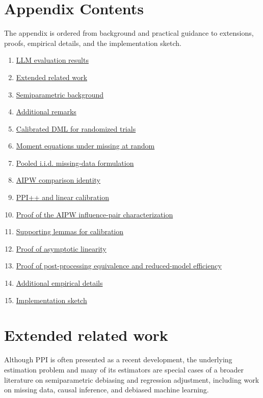 \documentclass{article}
\theoremstyle{plain}
\theoremstyle{definition}
\newcommand{\1}{\mathbf{1}}
\begin{document}
\section*{Appendix Contents}
The appendix is ordered from background and practical guidance to extensions, proofs, empirical details, and the implementation sketch.
\begin{enumerate}[leftmargin=7mm,label=\Alph*.]
\item \hyperref[app:simresults]{LLM evaluation results}
\item \hyperref[app:related-work]{Extended related work}
\item \hyperref[app:semicolon]{Semiparametric background}
\item \hyperref[appendix:remarks]{Additional remarks}
\item \hyperref[app:causal]{Calibrated DML for randomized trials}
\item \hyperref[appendix::momentgeneral]{Moment equations under missing at random}
\item \hyperref[app:iid]{Pooled i.i.d. missing-data formulation}
\item \hyperref[app:repr]{AIPW comparison identity}
\item \hyperref[sec:ppi++]{PPI++ and linear calibration}
\item \hyperref[app:eif]{Proof of the AIPW influence-pair characterization}
\item \hyperref[app:iso-lemmas]{Supporting lemmas for calibration}
\item \hyperref[app:al]{Proof of asymptotic linearity}
\item \hyperref[app:eff]{Proof of post-processing equivalence and reduced-model efficiency}
\item \hyperref[app:empirical]{Additional empirical details}
\item \hyperref[appendix:code]{Implementation sketch}
\end{enumerate}

\section{Extended related work}
\label{app:related-work}

Although PPI is often presented as a recent development, the underlying estimation problem and many of its estimators are special cases of a broader literature on semiparametric debiasing and regression adjustment, including work on missing data, causal inference, and debiased machine learning.
\end{document}
